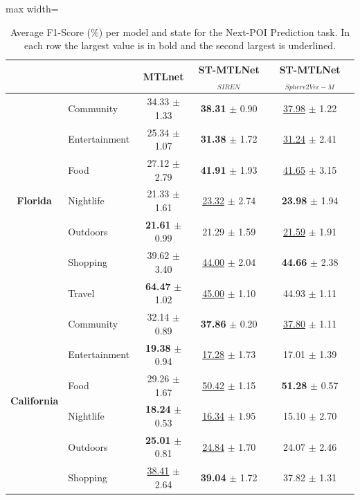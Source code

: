 \begin{table}[htbp]
\centering
\caption{Average F1-Score (\%) per model and state for the Next-POI Prediction task. In each row the largest value is in bold and the second largest is underlined.}
\label{tab:courb:next}
\begin{adjustbox}{max width=\textwidth}
\begin{tabular}{clccc}
\toprule
 & & \textbf{MTLnet} & \textbf{ST-MTLNet$_{SIREN}$} & \textbf{ST-MTLNet$_{Sphere2Vec-M}$} \\
\midrule
\multirow{7}{*}{\textbf{Florida}} & Community & 34.33 $\pm$ 1.33 & \textbf{38.31} $\pm$ 0.90 & \underline{37.98} $\pm$ 1.22 \\
 & Entertainment & 25.34 $\pm$ 1.07 & \textbf{31.38} $\pm$ 1.72 & \underline{31.24} $\pm$ 2.41 \\
 & Food & 27.12 $\pm$ 2.79 & \textbf{41.91} $\pm$ 1.93 & \underline{41.65} $\pm$ 3.15 \\
 & Nightlife & 21.33 $\pm$ 1.61 & \underline{23.32} $\pm$ 2.74 & \textbf{23.98} $\pm$ 1.94 \\
 & Outdoors & \textbf{21.61} $\pm$ 0.99 & 21.29 $\pm$ 1.59 & \underline{21.59} $\pm$ 1.91 \\
 & Shopping & 39.62 $\pm$ 3.40 & \underline{44.00} $\pm$ 2.04 & \textbf{44.66} $\pm$ 2.38 \\
 & Travel & \textbf{64.47} $\pm$ 1.02 & \underline{45.00} $\pm$ 1.10 & 44.93 $\pm$ 1.11 \\
\midrule
\multirow{7}{*}{\textbf{California}} & Community & 32.14 $\pm$ 0.89 & \textbf{37.86} $\pm$ 0.20 & \underline{37.80} $\pm$ 1.11 \\
 & Entertainment & \textbf{19.38} $\pm$ 0.94 & \underline{17.28} $\pm$ 1.73 & 17.01 $\pm$ 1.39 \\
 & Food & 29.26 $\pm$ 1.67 & \underline{50.42} $\pm$ 1.15 & \textbf{51.28} $\pm$ 0.57 \\
 & Nightlife & \textbf{18.24} $\pm$ 0.53 & \underline{16.34} $\pm$ 1.95 & 15.10 $\pm$ 2.70 \\
 & Outdoors & \textbf{25.01} $\pm$ 0.81 & \underline{24.84} $\pm$ 1.70 & 24.07 $\pm$ 2.46 \\
 & Shopping & \underline{38.41} $\pm$ 2.64 & \textbf{39.04} $\pm$ 1.72 & 37.82 $\pm$ 1.31 \\

\end{tabular}
\end{adjustbox}
\end{table}
